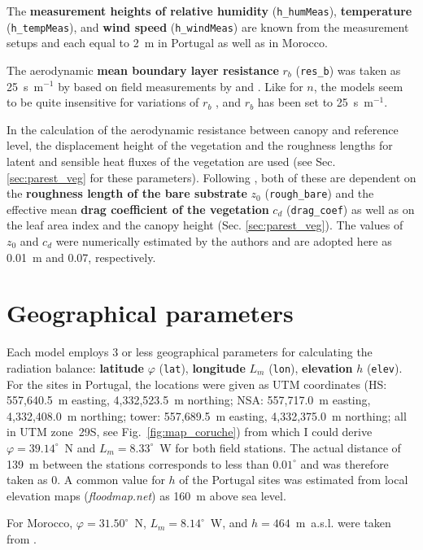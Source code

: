 \documentclass{scrreprt}
\begin{document}
The \textbf{measurement heights of relative humidity} (\verb!h_humMeas!), \textbf{temperature} (\verb!h_tempMeas!), and \textbf{wind speed} (\verb!h_windMeas!) are known from the measurement setups and each equal to 2~m in Portugal as well as in Morocco.

The aerodynamic \textbf{mean boundary layer resistance} $r_b$ (\verb!res_b!) was taken as 25~s~m$^{-1}$ by \citet{shuttleworth85} based on field measurements by \citet{denmead76} and \citet{uchijima76}.
Like for $n$, the models seem to be quite insensitive for variations of $r_b$ \citep{shuttleworth85}, and $r_b$ has been set to 25~s~m$^{-1}$.

In the calculation of the aerodynamic resistance between canopy and reference level, the displacement height of the vegetation and the roughness lengths for latent and sensible heat fluxes of the vegetation are used (see Sec. \ref{sec:parest_veg} for these parameters).
Following \citet{shuttleworth90}, both of these are dependent on the \textbf{roughness length of the bare substrate} $z_0$ (\verb!rough_bare!) and the effective mean \textbf{drag coefficient of the vegetation} $c_d$ (\verb!drag_coef!) as well as on the leaf area index and the canopy height (Sec. \ref{sec:parest_veg}).
The values of $z_0$ and $c_d$ were numerically estimated by the authors and are adopted here as 0.01~m and 0.07, respectively.

\newpage
\section{Geographical parameters} \label{sec:parest_geo}

Each model employs 3 or less geographical parameters for calculating the radiation balance: \textbf{latitude} $\varphi$ (\verb!lat!), \textbf{longitude} $L_m$ (\verb!lon!), \textbf{elevation} $h$ (\verb!elev!).
For the sites in Portugal, the locations were given as UTM coordinates (HS: 557,640.5~m easting, 4,332,523.5~m northing; NSA: 557,717.0~m easting, 4,332,408.0~m northing; tower: 557,689.5~m easting, 4,332,375.0~m northing; all in UTM zone~29S, see Fig.~\ref{fig:map_coruche}) from which I could derive $\varphi = 39.14^\circ$~N and $L_m= 8.33^\circ$~W for both field stations.
The actual distance of 139~m between the stations corresponds to less than $0.01^\circ$ and was therefore taken as 0.
A common value for $h$ of the Portugal sites was estimated from local elevation maps (\emph{floodmap.net}) as 160~m above sea level.

For Morocco, $\varphi = 31.50^\circ$~N, $L_m = 8.14^\circ$~W, and $h = 464$~m~a.s.l. were taken from \citet{mroos14}.
\end{document}
